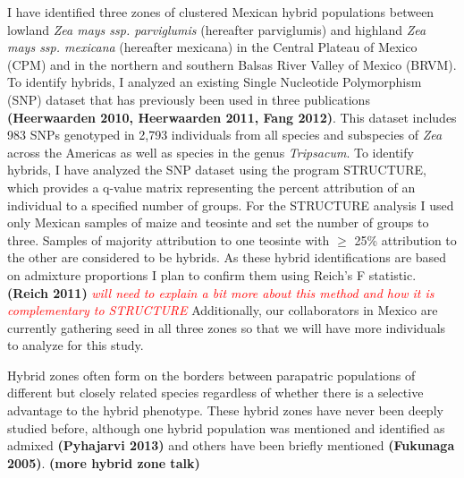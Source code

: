 \documentclass[12pt]{amsart}
\newcommand{\mbh}[1]{\textcolor{red}{ \emph{\scriptsize  #1}} }
\begin{document}
I have identified three zones of clustered Mexican hybrid populations between lowland \textit{Zea mays ssp. parviglumis} (hereafter parviglumis) and highland \textit{Zea mays ssp. mexicana} (hereafter mexicana) in the Central Plateau of Mexico (CPM) and in the northern and southern Balsas River Valley of Mexico (BRVM). 
To identify hybrids, I analyzed an existing Single Nucleotide Polymorphism (SNP) dataset that has previously been used in three publications \textbf{(Heerwaarden 2010, Heerwaarden 2011, Fang 2012)}.  
This dataset includes 983 SNPs genotyped in 2,793 individuals from all species and subspecies of \emph{Zea} across the Americas as well as species in the genus \textit{Tripsacum}.  
To identify hybrids, I have analyzed the SNP dataset using the program STRUCTURE, which provides a q-value matrix representing the percent attribution of an individual to a specified number of groups.  
For the STRUCTURE analysis I used only Mexican samples of maize and teosinte and set the number of groups to three.
Samples of majority attribution to one teosinte with $\geq$ 25\% attribution to the other are considered to be hybrids.
As these hybrid identifications are based on admixture proportions I plan to confirm them using Reich's F statistic. \textbf{(Reich  2011)}\mbh{will need to explain a bit more about this method and how it is complementary to STRUCTURE}
Additionally, our collaborators in Mexico are currently gathering seed in all three zones so that we will have more individuals to analyze for this study.

Hybrid zones often form on the borders between parapatric populations of different but closely related species regardless of whether there is a selective advantage to the hybrid phenotype.
These hybrid zones have never been deeply studied before, although one hybrid population was mentioned and identified as admixed \textbf{(Pyhajarvi 2013)}  and others have been briefly mentioned \textbf{(Fukunaga 2005)}. \textbf{(more hybrid zone talk)} %
\end{document}
